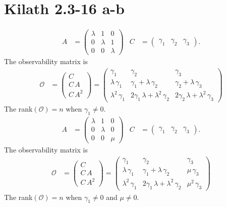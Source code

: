 \section{Kilath 2.3-16 a-b}
\begin{align*}
    A &= \begin{pmatrix} 
        \lambda & 1 & 0 \\
        0 & \lambda & 1 \\
        0 & 0 & \lambda
        \end{pmatrix} & C &= \begin{pmatrix}
            \gamma_1 & \gamma_2 & \gamma_3
        \end{pmatrix}.
\end{align*}
The observability matrix is 
\begin{align*}
    \mathcal{O} &= \begin{pmatrix}
        C\\
        C\,A\\
        C\,A^2
    \end{pmatrix} = \begin{pmatrix}
        \gamma_1 & \gamma_2 & \gamma_3 \\
        \lambda\,\gamma_1 & \gamma_1 + \lambda\,\gamma_2 & \gamma_2 + \lambda\,\gamma_3 \\
        \lambda^2\,\gamma_1 & 2\gamma_1\,\lambda + \lambda^2\,\gamma_2 & 2\gamma_2\,\lambda + \lambda^2\,\gamma_3
    \end{pmatrix}
\end{align*}
The rank$\left(\mathcal{O}\right) = n$ when $\gamma_1 \neq 0$. 
\begin{align*}
    A &= \begin{pmatrix} 
        \lambda & 1 & 0 \\
        0 & \lambda & 0 \\
        0 & 0 & \mu
        \end{pmatrix} & C &= \begin{pmatrix}
            \gamma_1 & \gamma_2 & \gamma_3
        \end{pmatrix}.
\end{align*}
The observability matrix is 
\begin{align*}
    \mathcal{O} &= \begin{pmatrix}
        C\\
        C\,A\\
        C\,A^2
    \end{pmatrix} = \begin{pmatrix}
        \gamma_1 & \gamma_2 & \gamma_3 \\
        \lambda\,\gamma_1 & \gamma_1 + \lambda\,\gamma_2 & \mu\,\gamma_3 \\
        \lambda^2\,\gamma_1 & 2\gamma_1\,\lambda + \lambda^2\,\gamma_2 & \mu^2\,\gamma_3
    \end{pmatrix}
\end{align*}
The rank$\left(\mathcal{O}\right) = n$ when $\gamma_1 \neq 0$ and $\mu \neq 0$. 